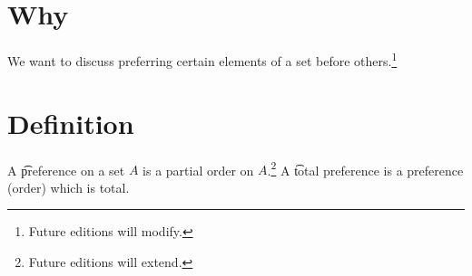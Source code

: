 
\section*{Why}

We want to discuss preferring certain elements of a set before others.\footnote{Future editions will modify.}

\section*{Definition}

A \t{preference} on a set $A$ is a partial order on $A$.\footnote{Future editions will extend.}
A \t{total preference} is a preference (order) which is total.

\blankpage